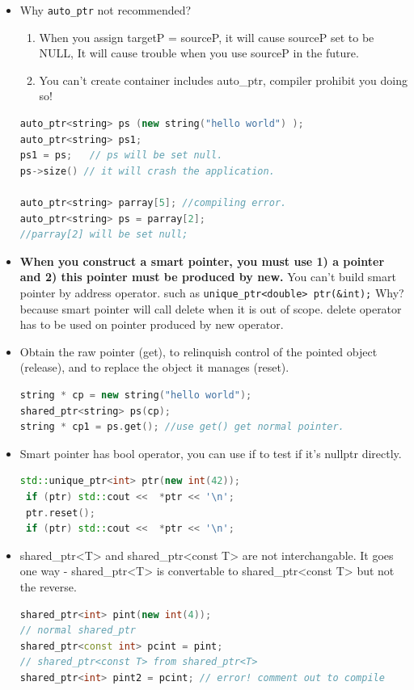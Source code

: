 \documentclass[a4paper,12pt,twoside]{book}
\begin{document}
\begin{itemize}
\item Why \texttt{auto\_ptr} not recommended? 
\begin{enumerate}
	\item When you assign targetP = sourceP, it will cause sourceP set to be NULL, It will cause trouble when you use sourceP in the future. 
	\item You can't create container includes auto\_ptr, compiler prohibit you doing so!
\end{enumerate}
\begin{lstlisting}[frame=single, language=c++]
auto_ptr<string> ps (new string("hello world") );
auto_ptr<string> ps1;
ps1 = ps;   // ps will be set null.
ps->size() // it will crash the application.

auto_ptr<string> parray[5]; //compiling error.
auto_ptr<string> ps = parray[2];
//parray[2] will be set null;
\end{lstlisting}

\item \textbf{When you construct a smart pointer, you must use 1) a pointer and 2) this pointer must be produced by new.} You can't build smart pointer by address operator. such as \texttt{unique\_ptr<double> ptr(\&int);}   Why? because smart pointer will call delete when it is out of scope.  delete operator has to be used on pointer produced by new operator.

\item Obtain the raw pointer (get), to relinquish control of the pointed object (release), and to replace the object it manages (reset).
\begin{lstlisting}[frame=single, language=c++]
string * cp = new string("hello world");
shared_ptr<string> ps(cp);
string * cp1 = ps.get(); //use get() get normal pointer.
\end{lstlisting}


\item Smart pointer has bool operator, you can use if to test if it's nullptr directly.
\begin{lstlisting}[frame=single, language=c++]
 std::unique_ptr<int> ptr(new int(42));
 if (ptr) std::cout <<  *ptr << '\n';
 ptr.reset();
 if (ptr) std::cout <<  *ptr << '\n';
\end{lstlisting}

\item shared\_ptr<T> and shared\_ptr<const T> are not interchangable. It goes one way - shared\_ptr<T> is convertable to shared\_ptr<const T> but not the reverse.
\begin{lstlisting}[frame=single, language=c++]
shared_ptr<int> pint(new int(4)); 
// normal shared_ptr
shared_ptr<const int> pcint = pint; 
// shared_ptr<const T> from shared_ptr<T>
shared_ptr<int> pint2 = pcint; // error! comment out to compile
\end{lstlisting}


\end{itemize}
\end{document}

